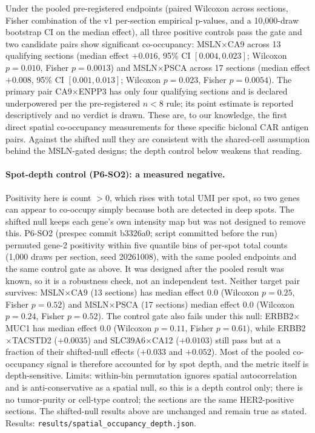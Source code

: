 \documentclass[11pt]{article}
\begin{document}
Under the pooled pre-registered endpoints (paired Wilcoxon across sections,
Fisher combination of the v1 per-section empirical p-values, and a 10{,}000-draw
bootstrap CI on the median effect), all three positive controls pass the gate
and two candidate pairs show significant co-occupancy: MSLN$\times$CA9 across
13 qualifying sections (median effect $+0.016$, 95\% CI $[0.004, 0.023]$;
Wilcoxon $p=0.010$, Fisher $p=0.0013$) and MSLN$\times$PSCA across 17 sections
(median effect $+0.008$, 95\% CI $[0.001, 0.013]$; Wilcoxon $p=0.023$, Fisher
$p=0.0054$). The primary pair CA9$\times$ENPP3 has only four qualifying
sections and is declared underpowered per the pre-registered $n<8$ rule; its
point estimate is reported descriptively and no verdict is drawn. These are,
to our knowledge, the first direct spatial co-occupancy measurements for these
specific biclonal CAR antigen pairs. Against the shifted null they are consistent
with the shared-cell assumption behind the MSLN-gated designs; the depth control
below weakens that reading.

\paragraph{Spot-depth control (P6-SO2): a measured negative.}
Positivity here is count $>0$, which rises with total UMI per spot, so two genes can
appear to co-occupy simply because both are detected in deep spots. The shifted null
keeps each gene's own intensity map but was not designed to remove this. P6-SO2
(prespec commit b3326a0; script committed before the run) permuted gene-2
positivity within five quantile bins of per-spot total counts (1{,}000 draws per
section, seed 20261008), with the same pooled endpoints and the same control gate as
above. It was designed after the pooled result was known, so it is a robustness
check, not an independent test. Neither target pair survives: MSLN$\times$CA9
(13 sections) has median effect $0.0$ (Wilcoxon $p=0.25$, Fisher $p=0.52$) and
MSLN$\times$PSCA (17 sections) median effect $0.0$ (Wilcoxon $p=0.24$, Fisher
$p=0.52$). The control gate also fails under this null: ERBB2$\times$MUC1 has median
effect $0.0$ (Wilcoxon $p=0.11$, Fisher $p=0.61$), while ERBB2$\times$TACSTD2
($+0.0035$) and SLC39A6$\times$CA12 ($+0.0103$) still pass but at a fraction of
their shifted-null effects ($+0.033$ and $+0.052$). Most of the pooled co-occupancy
signal is therefore accounted for by spot depth, and the metric itself is
depth-sensitive. Limits: within-bin permutation ignores spatial autocorrelation and
is anti-conservative as a spatial null, so this is a depth control only; there is no
tumor-purity or cell-type control; the sections are the same HER2-positive sections.
The shifted-null results above are unchanged and remain true as stated. Results:
\texttt{results/spatial\_occupancy\_depth.json}.
\end{document}
